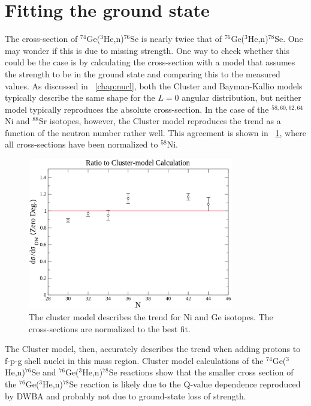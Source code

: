 \section{Fitting the \zp ground state}

The cross-section of $^{74}$Ge($^3$He,n)$^{76}$Se is nearly twice that of $^{76}$Ge($^3$He,n)$^{78}$Se.  One may wonder if this is due to missing \zp strength.  One way to check whether this could be the case is by calculating the cross-section with a model that assumes the \zp strength to be in the ground state and comparing this to the measured values.  As discussed in {\chap}~\ref{chap:nucl}, both the Cluster and Bayman-Kallio models typically describe the same shape for the $L=0$ angular distribution, but neither model typically reproduces the absolute cross-section.  In the case of the $^{58,60,62,64}$Ni and $^{88}$Sr isotopes, however, the Cluster model reproduces the trend as a function of the neutron number rather well.  This agreement is shown in {\fig}~\ref{fig:nickelTrend}, where all cross-sections have been normalized to $^{58}$Ni.  
\begin{figure}[!htbp]
\centering
\includegraphics[width=0.8\textwidth]{figures/nickel_trend.eps}
\caption{The cluster model describes the trend for Ni and Ge isotopes.  The cross-sections are normalized to the best fit.}
\label{fig:nickelTrend}
\end{figure}
The Cluster model, then, accurately describes the trend when adding protons to f-p-g shell nuclei in this mass region.  Cluster model calculations of the $^{74}$Ge($^3$He,n)$^{76}$Se and $^{76}$Ge($^3$He,n)$^{78}$Se reactions show that the smaller cross section of the $^{76}$Ge($^3$He,n)$^{78}$Se reaction is likely due to the Q-value dependence reproduced by DWBA and probably not due to ground-state loss of \zp strength.   


